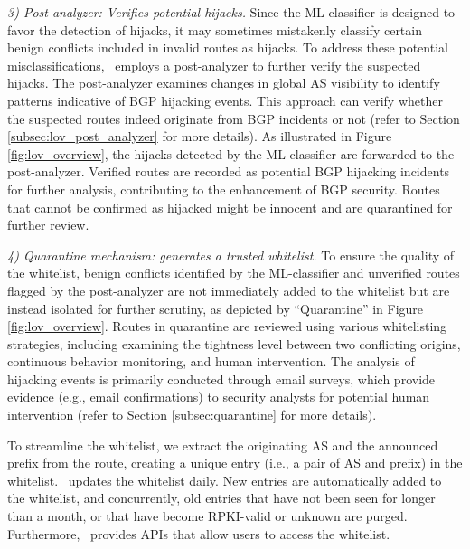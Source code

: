 \noindent\textit{3) Post-analyzer: Verifies potential hijacks.}
Since the ML classifier is designed to favor the detection of hijacks, it may sometimes mistakenly classify certain benign conflicts included in invalid routes as hijacks. To address these potential misclassifications, \lov\ employs a post-analyzer to further verify the suspected hijacks.
The post-analyzer examines changes in global AS visibility to identify patterns indicative of BGP hijacking events.
This approach can verify whether the suspected routes indeed originate from BGP incidents or not (refer to Section \ref{subsec:lov_post_analyzer} for more details).
As illustrated in Figure \ref{fig:lov_overview}, the hijacks detected by the ML-classifier are forwarded to the post-analyzer.
Verified routes are recorded as potential BGP hijacking incidents for further analysis, contributing to the enhancement of BGP security. Routes that cannot be confirmed as hijacked might be innocent and are quarantined for further review. 

\noindent\textit{4) Quarantine mechanism: generates a trusted whitelist.}
To ensure the quality of the whitelist, benign conflicts identified by the ML-classifier and unverified routes flagged by the post-analyzer are not immediately added to the whitelist but are instead isolated for further scrutiny, as depicted by ``Quarantine'' in Figure \ref{fig:lov_overview}.
Routes in quarantine are reviewed using various whitelisting strategies, including examining the tightness level between two conflicting origins, continuous behavior monitoring, and human intervention.
The analysis of hijacking events is primarily conducted through email surveys, which provide evidence (e.g., email confirmations) to security analysts for potential human intervention (refer to Section \ref{subsec:quarantine} for more details).

To streamline the whitelist, we extract the originating AS and the announced prefix from the route, creating a unique entry (i.e., a pair of AS and prefix) in the whitelist.
\lov\ updates the whitelist daily. New entries are automatically added to the whitelist, and concurrently, old entries that have not been seen for longer than a month, or that have become RPKI-valid or unknown are purged.
Furthermore, \lov\ provides APIs that allow users to access the whitelist.